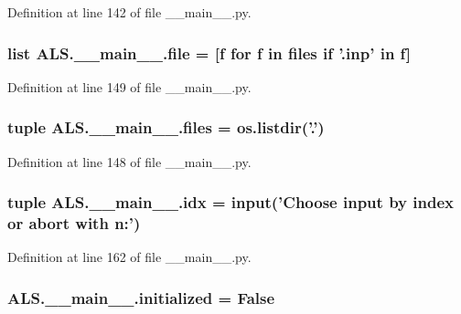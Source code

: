 Definition at line 142 of file \+\_\+\+\_\+main\+\_\+\+\_\+.\+py.

\hypertarget{namespace_a_l_s_1_1____main_____aa5b527ae9e22a81c1b94a9de1950f075}{
\subsubsection[{file}]{\setlength{\rightskip}{0pt plus 5cm}list A\+L\+S.\+\_\+\+\_\+main\+\_\+\+\_\+.\+file = \mbox{[}f for f in {\bf files} if '.inp' in f\mbox{]}}}\label{namespace_a_l_s_1_1____main_____aa5b527ae9e22a81c1b94a9de1950f075}


Definition at line 149 of file \+\_\+\+\_\+main\+\_\+\+\_\+.\+py.

\hypertarget{namespace_a_l_s_1_1____main_____a0d16fe12e38a76b5e5c925f6f685b55b}{
\subsubsection[{files}]{\setlength{\rightskip}{0pt plus 5cm}tuple A\+L\+S.\+\_\+\+\_\+main\+\_\+\+\_\+.\+files = os.\+listdir('.')}}\label{namespace_a_l_s_1_1____main_____a0d16fe12e38a76b5e5c925f6f685b55b}


Definition at line 148 of file \+\_\+\+\_\+main\+\_\+\+\_\+.\+py.

\hypertarget{namespace_a_l_s_1_1____main_____a5aa0409d9d67fa40ab9ea2c561dacb51}{
\subsubsection[{idx}]{\setlength{\rightskip}{0pt plus 5cm}tuple A\+L\+S.\+\_\+\+\_\+main\+\_\+\+\_\+.\+idx = input('Choose input by index or abort with n\+:')}}\label{namespace_a_l_s_1_1____main_____a5aa0409d9d67fa40ab9ea2c561dacb51}


Definition at line 162 of file \+\_\+\+\_\+main\+\_\+\+\_\+.\+py.

\hypertarget{namespace_a_l_s_1_1____main_____aa9daddee8a81563388242dfedc17c588}{
\subsubsection[{initialized}]{\setlength{\rightskip}{0pt plus 5cm}A\+L\+S.\+\_\+\+\_\+main\+\_\+\+\_\+.\+initialized = False}}\label{namespace_a_l_s_1_1____main_____aa9daddee8a81563388242dfedc17c588}


